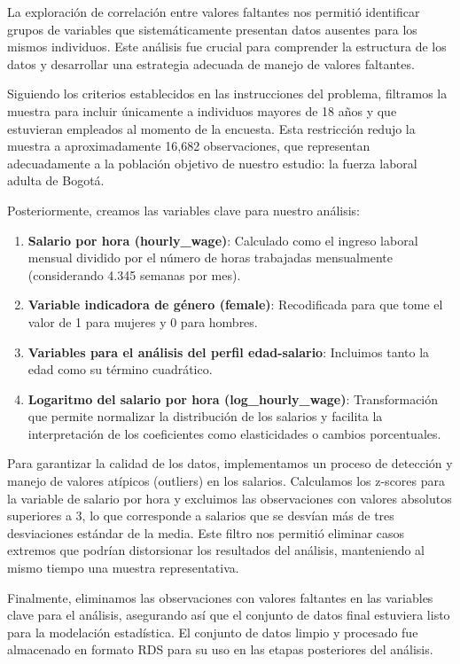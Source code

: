 \documentclass[12pt,a4paper,onecolumn]{article}
\begin{document}
La exploración de correlación entre valores faltantes nos permitió identificar grupos de variables que sistemáticamente presentan datos ausentes para los mismos individuos. Este análisis fue crucial para comprender la estructura de los datos y desarrollar una estrategia adecuada de manejo de valores faltantes.

Siguiendo los criterios establecidos en las instrucciones del problema, filtramos la muestra para incluir únicamente a individuos mayores de 18 años y que estuvieran empleados al momento de la encuesta. Esta restricción redujo la muestra a aproximadamente 16,682 observaciones, que representan adecuadamente a la población objetivo de nuestro estudio: la fuerza laboral adulta de Bogotá.

Posteriormente, creamos las variables clave para nuestro análisis:

\begin{enumerate}
    \item \textbf{Salario por hora (hourly\_wage)}: Calculado como el ingreso laboral mensual dividido por el número de horas trabajadas mensualmente (considerando 4.345 semanas por mes).
    \item \textbf{Variable indicadora de género (female)}: Recodificada para que tome el valor de 1 para mujeres y 0 para hombres.
    \item \textbf{Variables para el análisis del perfil edad-salario}: Incluimos tanto la edad como su término cuadrático.
    \item \textbf{Logaritmo del salario por hora (log\_hourly\_wage)}: Transformación que permite normalizar la distribución de los salarios y facilita la interpretación de los coeficientes como elasticidades o cambios porcentuales.
\end{enumerate}

Para garantizar la calidad de los datos, implementamos un proceso de detección y manejo de valores atípicos (outliers) en los salarios. Calculamos los z-scores para la variable de salario por hora y excluimos las observaciones con valores absolutos superiores a 3, lo que corresponde a salarios que se desvían más de tres desviaciones estándar de la media. Este filtro nos permitió eliminar casos extremos que podrían distorsionar los resultados del análisis, manteniendo al mismo tiempo una muestra representativa.

Finalmente, eliminamos las observaciones con valores faltantes en las variables clave para el análisis, asegurando así que el conjunto de datos final estuviera listo para la modelación estadística. El conjunto de datos limpio y procesado fue almacenado en formato RDS para su uso en las etapas posteriores del análisis.
\end{document}
